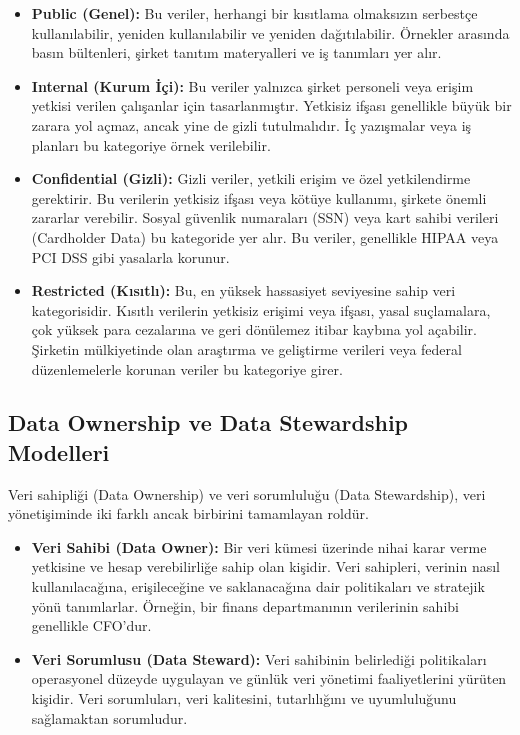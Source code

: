 \begin{itemize}
    \item \textbf{Public (Genel):} Bu veriler, herhangi bir kısıtlama olmaksızın serbestçe kullanılabilir, yeniden kullanılabilir ve yeniden dağıtılabilir. Örnekler arasında basın bültenleri, şirket tanıtım materyalleri ve iş tanımları yer alır.
    \item \textbf{Internal (Kurum İçi):} Bu veriler yalnızca şirket personeli veya erişim yetkisi verilen çalışanlar için tasarlanmıştır. Yetkisiz ifşası genellikle büyük bir zarara yol açmaz, ancak yine de gizli tutulmalıdır. İç yazışmalar veya iş planları bu kategoriye örnek verilebilir.
    \item \textbf{Confidential (Gizli):} Gizli veriler, yetkili erişim ve özel yetkilendirme gerektirir. Bu verilerin yetkisiz ifşası veya kötüye kullanımı, şirkete önemli zararlar verebilir. Sosyal güvenlik numaraları (SSN) veya kart sahibi verileri (Cardholder Data) bu kategoride yer alır. Bu veriler, genellikle HIPAA veya PCI DSS gibi yasalarla korunur.
    \item \textbf{Restricted (Kısıtlı):} Bu, en yüksek hassasiyet seviyesine sahip veri kategorisidir. Kısıtlı verilerin yetkisiz erişimi veya ifşası, yasal suçlamalara, çok yüksek para cezalarına ve geri dönülemez itibar kaybına yol açabilir. Şirketin mülkiyetinde olan araştırma ve geliştirme verileri veya federal düzenlemelerle korunan veriler bu kategoriye girer.
\end{itemize}

\subsection{Data Ownership ve Data Stewardship Modelleri}

Veri sahipliği (Data Ownership) ve veri sorumluluğu (Data Stewardship), veri yönetişiminde iki farklı ancak birbirini tamamlayan roldür.

\begin{itemize}
    \item \textbf{Veri Sahibi (Data Owner):} Bir veri kümesi üzerinde nihai karar verme yetkisine ve hesap verebilirliğe sahip olan kişidir. Veri sahipleri, verinin nasıl kullanılacağına, erişileceğine ve saklanacağına dair politikaları ve stratejik yönü tanımlarlar. Örneğin, bir finans departmanının verilerinin sahibi genellikle CFO'dur.
    \item \textbf{Veri Sorumlusu (Data Steward):} Veri sahibinin belirlediği politikaları operasyonel düzeyde uygulayan ve günlük veri yönetimi faaliyetlerini yürüten kişidir. Veri sorumluları, veri kalitesini, tutarlılığını ve uyumluluğunu sağlamaktan sorumludur.
\end{itemize}

